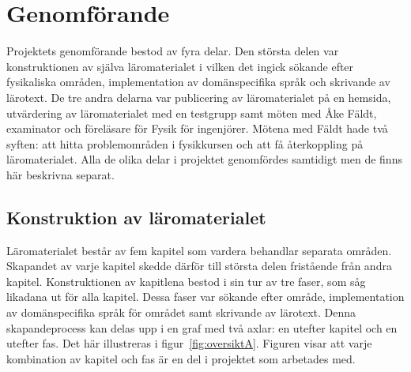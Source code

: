 



\chapter{Genomförande}

Projektets genomförande bestod av fyra delar. Den största delen var
konstruktionen av själva läromaterialet i vilken det ingick sökande efter fysikaliska
områden, implementation av domänspecifika språk och skrivande av lärotext. De
tre andra delarna var publicering av läromaterialet på en hemsida, utvärdering
av läromaterialet med en testgrupp samt möten med Åke Fäldt, examinator och
föreläsare för Fysik för ingenjörer. Mötena med Fäldt hade två syften: att hitta
problemområden i fysikkursen och att få återkoppling på läromaterialet. Alla de olika delar i projektet genomfördes samtidigt men de finns här beskrivna separat.

\section{Konstruktion av läromaterialet}\label{sec:konstruktion}

Läromaterialet består av fem kapitel som vardera behandlar separata
områden. Skapandet av varje kapitel skedde därför till största delen fristående
från andra kapitel. Konstruktionen av kapitlena bestod i sin tur av tre faser,
som såg likadana ut för alla kapitel. Dessa faser var sökande efter område,
implementation av domänspecifika språk för området samt skrivande av lärotext. Denna skapandeprocess kan delas upp i en graf med två axlar: en utefter kapitel
och en utefter fas. Det här illustreras i figur~\ref{fig:oversiktA}. Figuren
visar att varje kombination av kapitel och fas är en del i projektet som
arbetades med.

